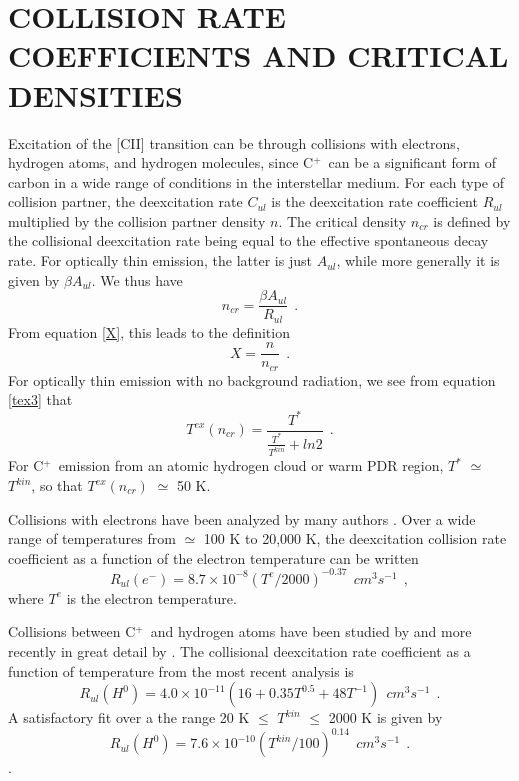 \documentclass[12pt]{aastex}
\def \lp{\>\> .}
\def \lc{\>\> ,}
\def \cp{C$^+$}
\def \C2{C{\sc II}}
\def \be{\begin{equation}}
\def \ee{   \end{equation}}
\def \lc{\>\> ,}
\def \lp{\>\> .}
\begin{document}
\section{\label{rates} COLLISION RATE COEFFICIENTS AND CRITICAL DENSITIES}

Excitation of the [\C2] transition can be through collisions with electrons, hydrogen atoms, and hydrogen molecules, since \cp\ can be a significant form of carbon in a wide range of conditions in the interstellar medium.   
For each type of collision partner, the deexcitation rate  $C_{ul}$ is the deexcitation rate coefficient $R_{ul}$  multiplied by the collision partner density $n$.  
The critical density $n_{cr}$ is defined by the collisional deexcitation rate being equal to the effective spontaneous decay rate.  
For optically thin emission, the latter is just $A_{ul}$, while more generally it is given by $\beta A_{ul}$.  
We thus have
\be
n_{cr} = \frac{\beta A_{ul}}{R_{ul}} \lp
\label{ncr}
\ee
From equation \ref{X}, this leads to the definition
\be
X = \frac{n}{n_{cr}} \lp
\ee
For optically thin emission with no background radiation, we see from equation \ref{tex3} that
\be
T^{ex}(n_{cr}) = \frac{T^*}{\frac{T^*}{T^{kin}} + ln 2 }\lp
\ee
For \cp\ emission from an atomic hydrogen cloud or warm PDR region, $T^*$ $\simeq$ $T^{kin}$, so that $T^{ex}(n_{cr})$ $\simeq$ 50 K.

Collisions with electrons have been analyzed by many authors \citep{keenan1986, blum1991, blum1992, wilson2002}.  
Over a wide range of temperatures from $\simeq$ 100 K to 20,000 K, the deexcitation collision rate coefficient as a function of the electron temperature can be written
\be
R_{ul} (e^-) = 8.7\times10^{-8} (T^e/2000)^{-0.37} ~~cm^3s^{-1} \lc
\label{electrons}
\ee
where $T^e$ is the electron temperature. 

Collisions between \cp\ and hydrogen atoms have been studied by \citet{launay1977} and more recently in great detail by \citet{barinovs2005}.  The collisional deexcitation rate coefficient as a function of temperature from the most recent analysis is
\be
R_{ul}(H^0) = 4.0\times10^{-11}(16 + 0.35T^{0.5} + 48T^{-1}) ~~cm^3s^{-1} \lp
\ee
A satisfactory fit over a the range 20 K $\leq$ $T^{kin}$ $\leq$ 2000 K is given by
\be
R_{ul}(H^0) = 7.6\times10^{-10} (T^{kin}/100)^{0.14} ~~cm^3s^{-1} \lp
\ee.
\end{document}
